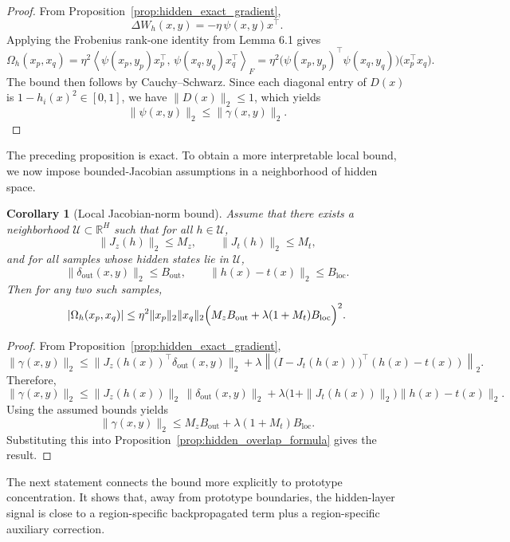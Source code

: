 \documentclass{article}
\newtheorem{cor}[thm]{Corollary}
\theoremstyle{definition}
\theoremstyle{remark}
\begin{document}
\begin{proof}
From Proposition~\ref{prop:hidden_exact_gradient},
\[
\Delta W_h(x,y)=-\eta\,\psi(x,y)x^\top.
\]
Applying the Frobenius rank-one identity from Lemma 6.1 gives
\[
\Omega_h(x_p,x_q)
=
\eta^2
\left\langle
\psi(x_p,y_p)x_p^\top,\,
\psi(x_q,y_q)x_q^\top
\right\rangle_F
=
\eta^2
\bigl(\psi(x_p,y_p)^\top\psi(x_q,y_q)\bigr)
\bigl(x_p^\top x_q\bigr).
\]
The bound then follows by Cauchy--Schwarz. Since each diagonal entry of
\(D(x)\) is \(1-h_i(x)^2\in[0,1]\), we have \(\|D(x)\|_2\le 1\), which yields
\[
\|\psi(x,y)\|_2\le \|\gamma(x,y)\|_2.
\]
\end{proof}

The preceding proposition is exact. To obtain a more interpretable local bound,
we now impose bounded-Jacobian assumptions in a neighborhood of hidden space.

\begin{cor}[Local Jacobian-norm bound]
\label{cor:hidden_local_bound}
Assume that there exists a neighborhood \(\mathcal{U}\subset\mathbb{R}^H\) such
that for all \(h\in\mathcal{U}\),
\[
\|J_z(h)\|_2\le M_z,
\qquad
\|J_t(h)\|_2\le M_t,
\]
and for all samples whose hidden states lie in \(\mathcal{U}\),
\[
\|\delta_{\mathrm{out}}(x,y)\|_2\le B_{\mathrm{out}},
\qquad
\|h(x)-t(x)\|_2\le B_{\mathrm{loc}}.
\]
Then for any two such samples,
\[
|\Omega_h(x_p,x_q)|
\le
\eta^2
\|x_p\|_2\|x_q\|_2
\Bigl(
M_z B_{\mathrm{out}}
+
\lambda(1+M_t)B_{\mathrm{loc}}
\Bigr)^2.
\]
\end{cor}

\begin{proof}
From Proposition~\ref{prop:hidden_exact_gradient},
\[
\|\gamma(x,y)\|_2
\le
\|J_z(h(x))^\top \delta_{\mathrm{out}}(x,y)\|_2
+
\lambda
\left\|
\bigl(I-J_t(h(x))\bigr)^\top (h(x)-t(x))
\right\|_2.
\]
Therefore,
\[
\|\gamma(x,y)\|_2
\le
\|J_z(h(x))\|_2\,\|\delta_{\mathrm{out}}(x,y)\|_2
+
\lambda\bigl(1+\|J_t(h(x))\|_2\bigr)\|h(x)-t(x)\|_2.
\]
Using the assumed bounds yields
\[
\|\gamma(x,y)\|_2
\le
M_z B_{\mathrm{out}}+\lambda(1+M_t)B_{\mathrm{loc}}.
\]
Substituting this into Proposition~\ref{prop:hidden_overlap_formula} gives
the result.
\end{proof}

The next statement connects the bound more explicitly to prototype
concentration. It shows that, away from prototype boundaries, the hidden-layer
signal is close to a region-specific backpropagated term plus a region-specific
auxiliary correction.
\end{document}
